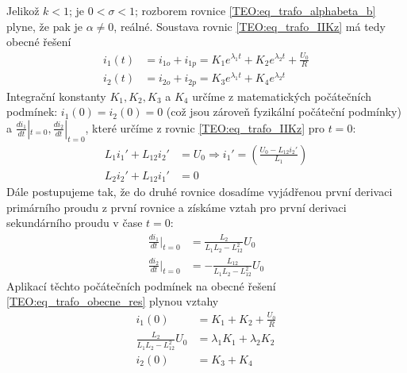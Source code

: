 \begin{example}
  Jelikož $k<1$; je $0<\sigma<1$; rozborem rovnice \ref{TEO:eq_trafo_alphabeta_b} plyne, že pak
  je $\alpha\neq0$, reálné. Soustava rovnic \ref{TEO:eq_trafo_IIKz} má tedy obecné řešení
  \begin{subequations}\label{TEO:eq_trafo_obecne_res}
    \begin{align}
      i_1(t) &= i_{1o} +i_{1p} = K_1e^{\lambda_1t} + K_2e^{\lambda_2t} +\frac{U_0}{R} \\
      i_2(t) &= i_{2o} +i_{2p} = K_3e^{\lambda_1t} + K_4e^{\lambda_2t}
    \end{align}
  \end{subequations}
  Integrační konstanty $K_1, K_2, K_3$ a $K_4$ určíme z matematických počátečních podmínek:
  $i_1(0)=i_2(0)=0$ (což jsou zároveň fyzikální počáteční podmínky) a $\frac{di_1}{dt}|_{t=0}, 
  \frac{di_2}{dt}|_{t=0}$, které určíme z rovnic \ref{TEO:eq_trafo_IIKz} pro $t=0$:
  \begin{subequations}\label{TEO:eq_trafo_didt_t0}
    \begin{align}
      L_1i_1'+L_{12}i_2' &= U_0 \Longrightarrow i_1' = \left(\frac{U_0-L_{12}i_2'}{L_1}\right)\\
      L_2i_2'+L_{12}i_1' &= 0
    \end{align}
  \end{subequations}
  Dále postupujeme tak, že do druhé rovnice dosadíme vyjádřenou první derivaci primárního
  proudu z první rovnice a získáme vztah pro první derivaci sekundárního proudu v čase $t=0$:
    \begin{subequations}\label{TEO:eq_trafo_dev_i1i2}
    \begin{align}
      \frac{di_1}{dt}|_{t=0} &=   \frac{L_{2}}{L_1L_2-L_{12}^2}U_0                        \\
      \frac{di_2}{dt}|_{t=0} &=  -\frac{L_{12}}{L_1L_2-L_{12}^2}U_0
    \end{align}
  \end{subequations}
  Aplikací těchto počátečních podmínek na obecné řešení \ref{TEO:eq_trafo_obecne_res} plynou
  vztahy
  \begin{subequations}
    \begin{align}
    i_1(0)                            &= K_1 + K_2 +\frac{U_0}{R}                         \\
    \frac{L_{2}}{L_1L_2-L_{12}^2}U_0  &= \lambda_1K_1 + \lambda_2K_2                      \\
    i_2(0)                            &= K_3 + K_4                                        \\

\end{align}
\end{subequations}
\end{example}
